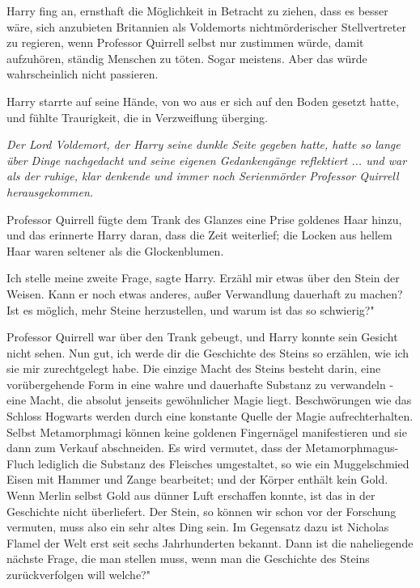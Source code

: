 Harry fing an, ernsthaft die Möglichkeit in Betracht zu ziehen, dass es besser
wäre, sich anzubieten Britannien als Voldemorts nichtmörderischer Stellvertreter
zu regieren, wenn Professor Quirrell selbst nur zustimmen würde, damit
aufzuhören, ständig Menschen zu töten. Sogar meistens. Aber das würde
wahrscheinlich nicht passieren.

Harry starrte auf seine Hände, von wo aus er sich auf den Boden gesetzt hatte,
und fühlte Traurigkeit, die in Verzweiflung überging.

\emph{Der Lord Voldemort, der Harry seine dunkle Seite gegeben hatte, hatte so
lange über Dinge nachgedacht und seine eigenen Gedankengänge reflektiert ... und
war als der ruhige, klar denkende und immer noch Serienmörder Professor Quirrell
herausgekommen.}

Professor Quirrell fügte dem Trank des Glanzes eine Prise goldenes Haar hinzu,
und das erinnerte Harry daran, dass die Zeit weiterlief; die Locken aus hellem
Haar waren seltener als die Glockenblumen.

\glqq{}Ich stelle meine zweite Frage\grqq{}, sagte Harry. \glqq{}Erzähl mir etwas
über den Stein der Weisen. Kann er noch etwas anderes, außer Verwandlung
dauerhaft zu machen? Ist es möglich, mehr Steine herzustellen, und warum ist das
so schwierig?"

Professor Quirrell war über den Trank gebeugt, und Harry konnte sein Gesicht
nicht sehen. \glqq{}Nun gut, ich werde dir die Geschichte des Steins so erzählen,
wie ich sie mir zurechtgelegt habe. Die einzige Macht des Steins besteht darin,
eine vorübergehende Form in eine wahre und dauerhafte Substanz zu verwandeln -
eine Macht, die absolut jenseits gewöhnlicher Magie liegt. Beschwörungen wie das
Schloss Hogwarts werden durch eine konstante Quelle der Magie aufrechterhalten.
Selbst Metamorphmagi können keine goldenen Fingernägel manifestieren und sie
dann zum Verkauf abschneiden. Es wird vermutet, dass der Metamorphmagus-Fluch
lediglich die Substanz des Fleisches umgestaltet, so wie ein Muggelschmied Eisen
mit Hammer und Zange bearbeitet; und der Körper enthält kein Gold. Wenn Merlin
selbst Gold aus dünner Luft erschaffen konnte, ist das in der Geschichte nicht
überliefert. Der Stein, so können wir schon vor der Forschung vermuten, muss
also ein sehr altes Ding sein. Im Gegensatz dazu ist Nicholas Flamel der Welt
erst seit sechs Jahrhunderten bekannt. Dann ist die naheliegende nächste Frage,
die man stellen muss, wenn man die Geschichte des Steins zurückverfolgen will
welche?"

